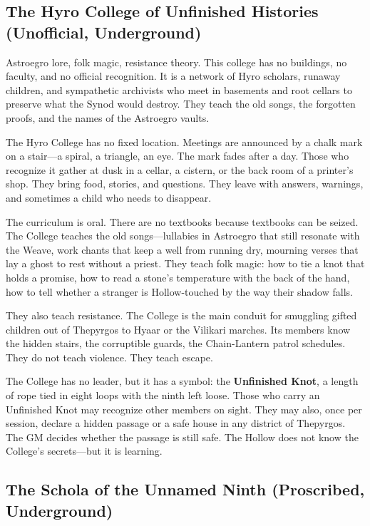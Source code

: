 \documentclass[10pt,twocolumn]{book}
\begin{document}
\subsection{The Hyro College of Unfinished Histories (Unofficial, Underground)}

Astroegro lore, folk magic, resistance theory. This college has no buildings, no faculty, and no official recognition. It is a network of Hyro scholars, runaway children, and sympathetic archivists who meet in basements and root cellars to preserve what the Synod would destroy. They teach the old songs, the forgotten proofs, and the names of the Astroegro vaults.

The Hyro College has no fixed location. Meetings are announced by a chalk mark on a stair---a spiral, a triangle, an eye. The mark fades after a day. Those who recognize it gather at dusk in a cellar, a cistern, or the back room of a printer's shop. They bring food, stories, and questions. They leave with answers, warnings, and sometimes a child who needs to disappear.

The curriculum is oral. There are no textbooks because textbooks can be seized. The College teaches the old songs---lullabies in Astroegro that still resonate with the Weave, work chants that keep a well from running dry, mourning verses that lay a ghost to rest without a priest. They teach folk magic: how to tie a knot that holds a promise, how to read a stone's temperature with the back of the hand, how to tell whether a stranger is Hollow-touched by the way their shadow falls.

They also teach resistance. The College is the main conduit for smuggling gifted children out of Thepyrgos to Hyaar or the Vilikari marches. Its members know the hidden stairs, the corruptible guards, the Chain-Lantern patrol schedules. They do not teach violence. They teach escape.

The College has no leader, but it has a symbol: the \textbf{Unfinished Knot}, a length of rope tied in eight loops with the ninth left loose. Those who carry an Unfinished Knot may recognize other members on sight. They may also, once per session, declare a hidden passage or a safe house in any district of Thepyrgos. The GM decides whether the passage is still safe. The Hollow does not know the College's secrets---but it is learning.

\subsection{The Schola of the Unnamed Ninth (Proscribed, Underground)}
\end{document}
